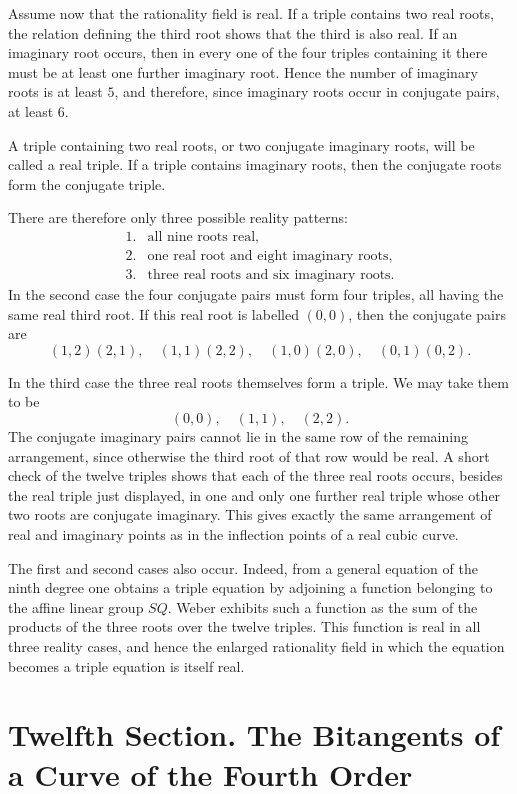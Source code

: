 \documentclass[11pt,a4paper]{book}
\newcommand{\booktitle}[1]{\clearpage\chapter*{#1}}
\begin{document}
Assume now that the rationality field is real.  If a triple contains two real roots, the relation defining the third root shows that the third is also real.  If an imaginary root occurs, then in every one of the four triples containing it there must be at least one further imaginary root.  Hence the number of imaginary roots is at least \(5\), and therefore, since imaginary roots occur in conjugate pairs, at least \(6\).

A triple containing two real roots, or two conjugate imaginary roots, will be called a real triple.  If a triple contains imaginary roots, then the conjugate roots form the conjugate triple.

There are therefore only three possible reality patterns:
\[
\begin{array}{ll}
1.&\text{all nine roots real},\\
2.&\text{one real root and eight imaginary roots},\\
3.&\text{three real roots and six imaginary roots}.
\end{array}
\]
In the second case the four conjugate pairs must form four triples, all having the same real third root.  If this real root is labelled \((0,0)\), then the conjugate pairs are
\[
(1,2)(2,1),\quad
(1,1)(2,2),\quad
(1,0)(2,0),\quad
(0,1)(0,2).
\]

In the third case the three real roots themselves form a triple.  We may take them to be
\[
(0,0),\quad(1,1),\quad(2,2).
\]
The conjugate imaginary pairs cannot lie in the same row of the remaining arrangement, since otherwise the third root of that row would be real.  A short check of the twelve triples shows that each of the three real roots occurs, besides the real triple just displayed, in one and only one further real triple whose other two roots are conjugate imaginary.  This gives exactly the same arrangement of real and imaginary points as in the inflection points of a real cubic curve.

The first and second cases also occur.  Indeed, from a general equation of the ninth degree one obtains a triple equation by adjoining a function belonging to the affine linear group \(SQ\).  Weber exhibits such a function as the sum of the products of the three roots over the twelve triples.  This function is real in all three reality cases, and hence the enlarged rationality field in which the equation becomes a triple equation is itself real.


\booktitle{Twelfth Section. The Bitangents of a Curve of the Fourth Order}
\end{document}

